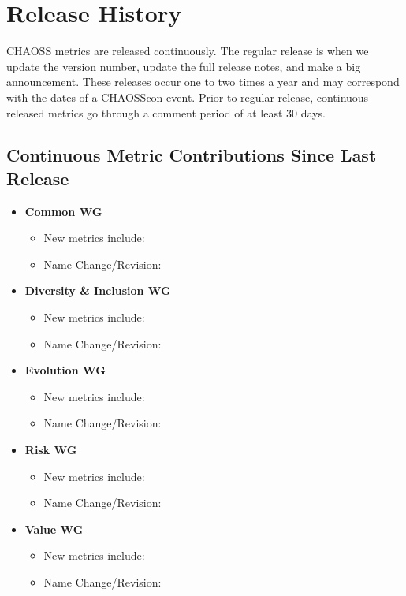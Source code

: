 \hypertarget{release-history}{%
\section{Release History}\label{release-history}}

CHAOSS metrics are released continuously. The regular release is when we
update the version number, update the full release notes, and make a big
announcement. These releases occur one to two times a year and may
correspond with the dates of a CHAOSScon event. Prior to regular
release, continuous released metrics go through a comment period of at
least 30 days.

\hypertarget{continuous-metric-contributions-since-last-release}{%
\subsection{Continuous Metric Contributions Since Last
Release}\label{continuous-metric-contributions-since-last-release}}

\begin{itemize}
\tightlist
\item
  \textbf{Common WG}

  \begin{itemize}
  \tightlist
  \item
    New metrics include:
  \item
    Name Change/Revision:
  \end{itemize}
\item
  \textbf{Diversity \& Inclusion WG}

  \begin{itemize}
  \tightlist
  \item
    New metrics include:
  \item
    Name Change/Revision:
  \end{itemize}
\item
  \textbf{Evolution WG}

  \begin{itemize}
  \tightlist
  \item
    New metrics include:
  \item
    Name Change/Revision:
  \end{itemize}
\item
  \textbf{Risk WG}

  \begin{itemize}
  \tightlist
  \item
    New metrics include:
  \item
    Name Change/Revision:
  \end{itemize}
\item
  \textbf{Value WG}

  \begin{itemize}
  \tightlist
  \item
    New metrics include:
  \item
    Name Change/Revision:
  \end{itemize}
\end{itemize}

